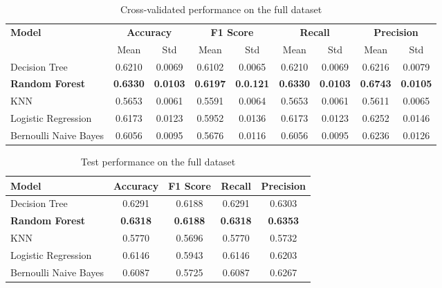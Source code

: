 \begin{table}[ht]
\centering
\caption{Cross-validated performance on the full dataset}
\label{tab:cv_performance_fd}
\renewcommand{\arraystretch}{1.2}
\begin{tabular}{lcccccccc}
\hline
\textbf{Model} & \multicolumn{2}{c}{\textbf{Accuracy}} & \multicolumn{2}{c}{\textbf{F1 Score}} & \multicolumn{2}{c}{\textbf{Recall}} & \multicolumn{2}{c}{\textbf{Precision}} \\
 & Mean & Std & Mean & Std & Mean & Std & Mean & Std \\
\hline
Decision Tree & 0.6210 & 0.0069 & 0.6102 & 0.0065 & 0.6210 & 0.0069 & 0.6216 & 0.0079 \\
\textbf{Random Forest} & \textbf{0.6330} & \textbf{0.0103} & \textbf{0.6197} & \textbf{0.0.121} & \textbf{0.6330} & \textbf{0.0103} & \textbf{0.6743} & \textbf{0.0105} \\
KNN & 0.5653 & 0.0061 & 0.5591 & 0.0064 & 0.5653 & 0.0061 & 0.5611 & 0.0065 \\
Logistic Regression & 0.6173 & 0.0123 & 0.5952 & 0.0136 & 0.6173 & 0.0123 & 0.6252 & 0.0146 \\
Bernoulli Naive Bayes & 0.6056 & 0.0095 & 0.5676 & 0.0116 & 0.6056 & 0.0095 & 0.6236 & 0.0126 \\
\hline
\end{tabular}
\end{table}

\begin{table}[ht]
\centering
\caption{Test performance on the full dataset}
\label{tab:test_performance_fd}
\begin{tabular}{lcccc}
\toprule
\textbf{Model} & \textbf{Accuracy} & \textbf{F1 Score} & \textbf{Recall} & \textbf{Precision} \\
\midrule
Decision Tree & 0.6291 & 0.6188 & 0.6291 & 0.6303 \\
\textbf{Random Forest} & \textbf{0.6318} & \textbf{0.6188} & \textbf{0.6318} & \textbf{0.6353} \\
KNN & 0.5770 & 0.5696 & 0.5770 & 0.5732 \\
Logistic Regression & 0.6146 & 0.5943 & 0.6146 & 0.6203 \\
Bernoulli Naive Bayes & 0.6087 & 0.5725 & 0.6087 & 0.6267 \\
\bottomrule
\end{tabular}
\end{table}


